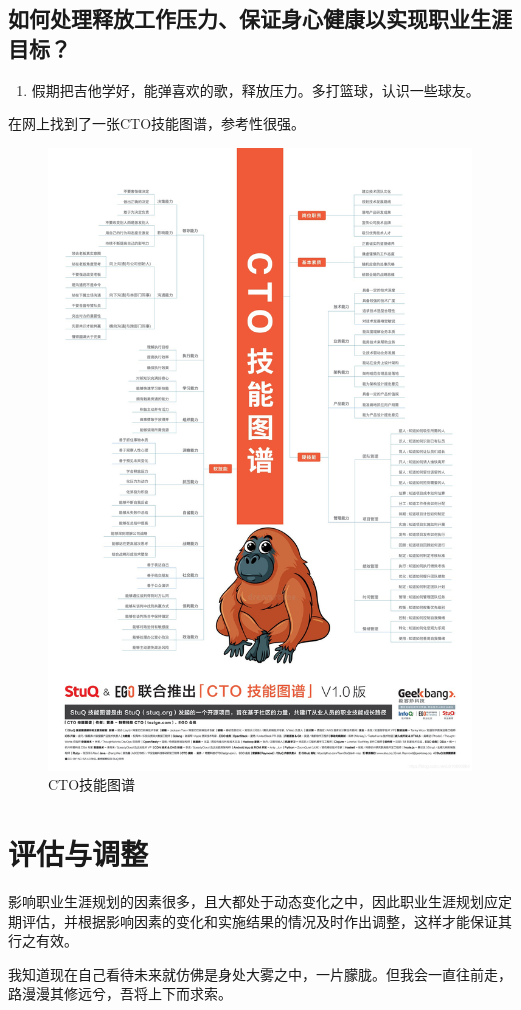 \documentclass{article}
\begin{document}
 \subsection{ 如何处理释放工作压力、保证身心健康以实现职业生涯目标？}
\begin{enumerate}
	\item 假期把吉他学好，能弹喜欢的歌，释放压力。多打篮球，认识一些球友。
\end{enumerate}
在网上找到了一张CTO技能图谱，参考性很强。
\begin{figure}[H]
	\centering
	\includegraphics[width=1\linewidth]{skillmap}
	\caption{CTO技能图谱}
	\label{fig:skillmap}
\end{figure}
\section{评估与调整}
影响职业生涯规划的因素很多，且大都处于动态变化之中，因此职业生涯规划应定期评估，并根据影响因素的变化和实施结果的情况及时作出调整，这样才能保证其行之有效。\par 
我知道现在自己看待未来就仿佛是身处大雾之中，一片朦胧。但我会一直往前走，路漫漫其修远兮，吾将上下而求索。\par 
\end{document}
